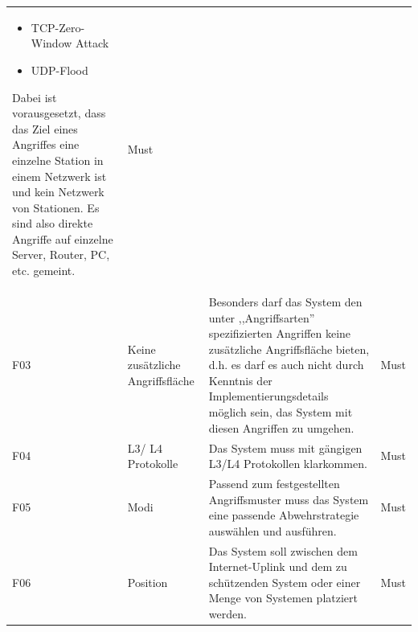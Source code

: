 \documentclass[../review_3.tex]{subfiles}
\begin{document}
\begin{longtable} [h] {p{1cm} p{4cm} p{7cm} l}
\begin{itemize}
        \item TCP-Zero-Window Attack
        \item UDP-Flood
    \end{itemize}
    Dabei ist vorausgesetzt, dass das Ziel eines Angriffes eine einzelne Station in einem Netzwerk ist und kein Netzwerk von Stationen. Es sind also direkte Angriffe auf einzelne Server, Router, PC, etc. gemeint. & Must                                                                                                                                                                                                                                                                                                                       \\
    F03                                                                                                                                                                                                              & Keine zusätzliche Angriffsfläche               & Besonders darf das System den unter ,,Angriffsarten'' spezifizierten Angriffen keine zusätzliche Angriffsfläche bieten, d.h. es darf es auch nicht durch Kenntnis der Implementierungsdetails möglich sein, das System mit diesen Angriffen zu umgehen. & Must            \\
    F04                                                                                                                                                                                                              & L3/ L4 Protokolle                              & Das System muss mit gängigen L3/L4 Protokollen klarkommen.                                                                                                                                                                                             & Must            \\
    F05                                                                                                                                                                                                              & Modi                                           & Passend zum festgestellten Angriffsmuster muss das System eine passende Abwehrstrategie auswählen und ausführen.                                                                                                                                        & Must            \\
    F06                                                                                                                                                                                                              & Position                                       & Das System soll zwischen dem Internet-Uplink und dem zu schützenden System oder einer Menge von Systemen platziert werden.                                                                                                                              & Must            \\

\end{longtable}
\end{document}
